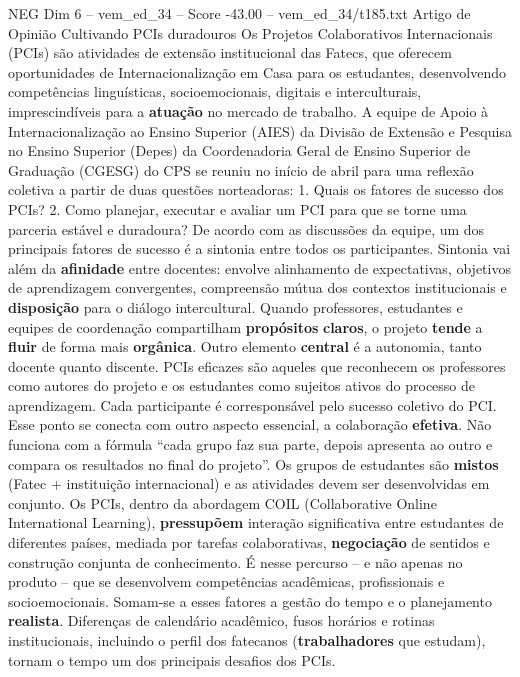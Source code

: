\begin{textsample}{NEG Dim 6 – vem\_ed\_34 – Score -43.00 – vem\_ed\_34/t185.txt}  \label{ex:f6_neg_001}
Artigo de Opinião Cultivando PCIs duradouros Os Projetos Colaborativos Internacionais (PCIs) são atividades de extensão institucional das Fatecs, que oferecem oportunidades de Internacionalização em Casa para os estudantes, desenvolvendo competências linguísticas, socioemocionais, digitais e interculturais, imprescindíveis para a \textbf{atuação} no mercado de trabalho.
A equipe de Apoio à Internacionalização ao Ensino Superior (AIES) da Divisão de Extensão e Pesquisa no Ensino Superior (Depes) da Coordenadoria Geral de Ensino Superior de Graduação (CGESG) do CPS se reuniu no início de abril para uma reflexão coletiva a partir de duas questões norteadoras: 1.
Quais os fatores de sucesso dos PCIs? 2.
Como planejar, executar e avaliar um PCI para que se torne uma parceria estável e duradoura?
De acordo com as discussões da equipe, um dos principais fatores de sucesso é a sintonia entre todos os participantes.
Sintonia vai além da \textbf{afinidade} entre docentes: envolve alinhamento de expectativas, objetivos de aprendizagem convergentes, compreensão mútua dos contextos institucionais e \textbf{disposição} para o diálogo intercultural.
Quando professores, estudantes e equipes de coordenação compartilham \textbf{propósitos} \textbf{claros}, o projeto \textbf{tende} a \textbf{fluir} de forma mais \textbf{orgânica}.
Outro elemento \textbf{central} é a autonomia, tanto docente quanto discente.
PCIs eficazes são aqueles que reconhecem os professores como autores do projeto e os estudantes como sujeitos ativos do processo de aprendizagem.
Cada participante é corresponsável pelo sucesso coletivo do PCI.
Esse ponto se conecta com outro aspecto essencial, a colaboração \textbf{efetiva}.
Não funciona com a fórmula “cada grupo faz sua parte, depois apresenta ao outro e compara os resultados no final do projeto”.
Os grupos de estudantes são \textbf{mistos} (Fatec + instituição internacional) e as atividades devem ser desenvolvidas em conjunto.
Os PCIs, dentro da abordagem COIL (Collaborative Online International Learning), \textbf{pressupõem} interação significativa entre estudantes de diferentes países, mediada por tarefas colaborativas, \textbf{negociação} de sentidos e construção conjunta de conhecimento.
É nesse percurso – e não apenas no produto – que se desenvolvem competências acadêmicas, profissionais e socioemocionais.
Somam-se a esses fatores a gestão do tempo e o planejamento \textbf{realista}.
Diferenças de calendário acadêmico, fusos horários e rotinas institucionais, incluindo o perfil dos fatecanos (\textbf{trabalhadores} que estudam), tornam o tempo um dos principais desafios dos PCIs.

\end{textsample}
